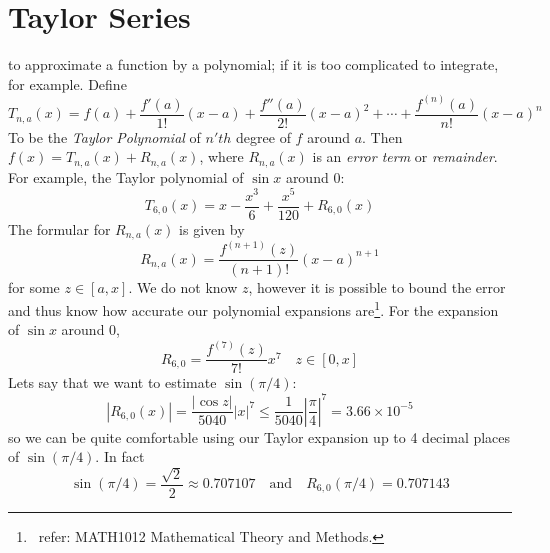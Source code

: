 \documentclass[10pt]{book}
\newcommand{\newthought}[1]{\vspace{0.5\baselineskip}\noindent{\scshape #1}}
\begin{document}
\section{Taylor Series}
\newthought{It is often convenient} to approximate a function by a polynomial; if it is too complicated to integrate,
for example. Define
\[T_{n,a}(x) = f(a) + \dfrac{f'(a)}{1!}(x-a) + \dfrac{f''(a)}{2!}{(x-a)}^2 + \cdots + \dfrac{f^{(n)}(a)}{n!}{(x-a)}^n\]
To be the \emph{Taylor Polynomial} of $n'th$ degree of $f$ around $a$. Then $f(x) = T_{n,a}(x)+R_{n,a}(x)$,
where $R_{n,a}(x)$ is an \emph{error term} or \emph{remainder}. For example, the Taylor polynomial of $\sin x$
around 0:
\[T_{6,0}(x) = x - \dfrac{x^3}{6} + \dfrac{x^5}{120} + R_{6,0}(x)\]
The formular for $R_{n,a}(x)$ is given by
\[R_{n,a}(x) = \dfrac{f^{(n+1)}(z)}{(n+1)!}{(x-a)}^{n+1}\]
for some $z \in [a,x]$. We do not know $z$, however it is possible to bound the error and thus know how
accurate our polynomial expansions are\footnote{\ refer: MATH1012 Mathematical Theory and Methods.}. For the
expansion of $\sin x$ around 0,
\[R_{6,0} = \dfrac{f^{(7)}(z)}{7!}x^7\quad z \in [0,x]\]
Lets say that we want to estimate $\sin(\pi/4)$:
\[|R_{6,0}(x)| = \dfrac{|\cos z|}{5040} |x|^7 \le \dfrac{1}{5040}\left|\dfrac{\pi}{4}\right|^7 = 3.66\times 10^{-5}\]
so we can be quite comfortable using our Taylor expansion up to 4 decimal places of $\sin (\pi/4)$. In fact
\[\sin(\pi/4) = \dfrac{\sqrt{2}}{2} \approx 0.707107 \quad \text{and} \quad R_{6,0}(\pi/4) = 0.707143\]
\end{document}
